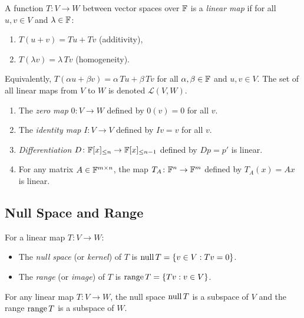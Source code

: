 \documentclass[11pt,a4paper]{article}
\begin{document}
\begin{definition}
\label{def:linear_map}
A function $T\colon V \to W$ between vector spaces over $\mathbb{F}$ is a \emph{linear
map} if for all $u, v \in V$ and $\lambda \in \mathbb{F}$:
\begin{enumerate}[nosep]
  \item $T(u + v) = Tu + Tv$ \quad (additivity),
  \item $T(\lambda v) = \lambda\, Tv$ \quad (homogeneity).
\end{enumerate}
Equivalently, $T(\alpha u + \beta v) = \alpha\, Tu + \beta\, Tv$ for all
$\alpha, \beta \in \mathbb{F}$ and $u, v \in V$.  The set of all linear maps from
$V$ to $W$ is denoted $\mathcal{L}(V, W)$.
\end{definition}

\begin{example}
\label{ex:linear_maps}
\begin{enumerate}[nosep]
  \item The \emph{zero map} $0\colon V \to W$ defined by $0(v) = 0$ for all $v$.
  \item The \emph{identity map} $I\colon V \to V$ defined by $Iv = v$ for all $v$.
  \item \emph{Differentiation} $D\colon \mathbb{F}[x]_{\leq n} \to \mathbb{F}[x]_{\leq n-1}$
        defined by $Dp = p'$ is linear.
  \item For any matrix $A \in \mathbb{F}^{m \times n}$, the map $T_A\colon \mathbb{F}^n \to \mathbb{F}^m$
        defined by $T_A(x) = Ax$ is linear.
\end{enumerate}
\end{example}

\subsection{Null Space and Range}

\begin{definition}
\label{def:null_range}
For a linear map $T\colon V \to W$:
\begin{itemize}[nosep]
  \item The \emph{null space} (or \emph{kernel}) of $T$ is
        $\operatorname{null} T = \{v \in V : Tv = 0\}$.
  \item The \emph{range} (or \emph{image}) of $T$ is
        $\operatorname{range} T = \{Tv : v \in V\}$.
\end{itemize}
\end{definition}

\begin{proposition}
\label{prop:null_range_subspace}
For any linear map $T\colon V \to W$, the null space $\operatorname{null} T$ is a
subspace of $V$ and the range $\operatorname{range} T$ is a subspace of $W$.
\end{proposition}
\end{document}
